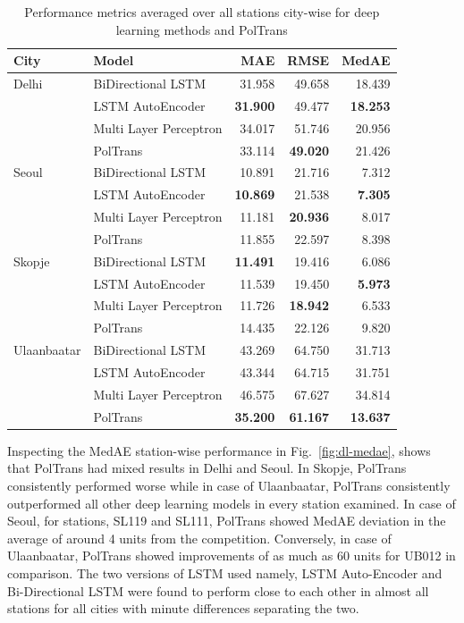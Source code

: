 \documentclass[twocolumn]{svjour3}          %
\begin{document}
\begin{table}[h]
\small
\centering
\tabcolsep=0.16cm
\caption{Performance metrics averaged over all stations city-wise for deep learning methods and PolTrans}
\label{tbl:dl-performance}
\begin{tabular}{llrrr}
\toprule
City & Model & MAE & RMSE & MedAE \\
\midrule
Delhi & BiDirectional LSTM & 31.958 & 49.658 & 18.439 \\
& LSTM AutoEncoder & \textbf{31.900} & 49.477 & \textbf{18.253} \\
& Multi Layer Perceptron & 34.017 & 51.746 & 20.956 \\
& PolTrans & 33.114 & \textbf{49.020} & 21.426 \\
Seoul & BiDirectional LSTM & 10.891 & 21.716 & 7.312 \\
& LSTM AutoEncoder & \textbf{10.869} & 21.538 & \textbf{7.305} \\
& Multi Layer Perceptron & 11.181 & \textbf{20.936} & 8.017 \\
& PolTrans & 11.855 & 22.597 & 8.398 \\
Skopje & BiDirectional LSTM & \textbf{11.491} & 19.416 & 6.086 \\
& LSTM AutoEncoder & 11.539 & 19.450 & \textbf{5.973} \\
& Multi Layer Perceptron & 11.726 & \textbf{18.942} & 6.533 \\
& PolTrans & 14.435 & 22.126 & 9.820 \\
Ulaanbaatar & BiDirectional LSTM & 43.269 & 64.750 & 31.713 \\
& LSTM AutoEncoder & 43.344 & 64.715 & 31.751 \\
& Multi Layer Perceptron & 46.575 & 67.627 & 34.814 \\
& PolTrans & \textbf{35.200} & \textbf{61.167} & \textbf{13.637} \\
\bottomrule
\end{tabular}
\end{table}

Inspecting the MedAE station-wise performance in Fig.~\ref{fig:dl-medae}, shows that {PolTrans} had mixed results in Delhi and Seoul. In Skopje, {PolTrans} consistently performed worse while in case of Ulaanbaatar, {PolTrans} consistently outperformed all other deep learning models in every station examined. In case of Seoul, for stations, SL119 and SL111, {PolTrans} showed MedAE deviation in the average of around 4 units from the competition. Conversely, in case of Ulaanbaatar, {PolTrans} showed improvements of as much as 60 units for UB012 in comparison. The two versions of LSTM used namely, LSTM Auto-Encoder and Bi-Directional LSTM were found to perform close to each other in almost all stations for all cities with minute differences separating the two.
\end{document}

